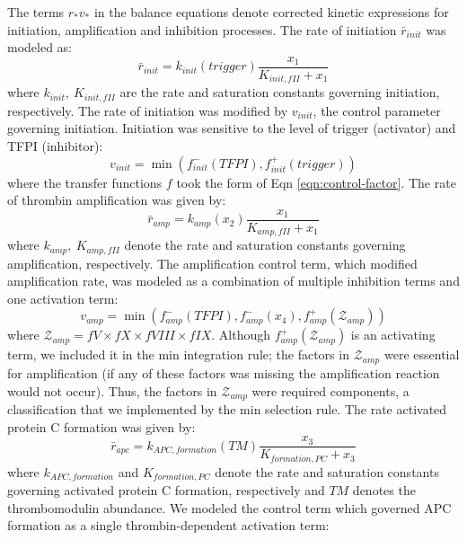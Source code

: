 \documentclass[processes,article,received,moreauthors,pdftex,12pt,a4paper]{mdpi}
\begin{document}
The terms $r_{*}v_{*}$ in the balance equations denote corrected kinetic expressions for initiation, amplification and inhibition processes. 
The rate of initiation $\bar{r}_{init}$ was modeled as:
\begin{equation}
	\bar{r}_{init} = k_{init}\left(trigger\right)\frac{x_{1}}{K_{init,fII} + x_{1}}
\end{equation}where $k_{init},~K_{init,fII}$ are the rate and saturation constants governing initiation, respectively. 
The rate of initiation was modified by $v_{init}$, the control parameter governing initiation. 
Initiation was sensitive to the level of trigger (activator) and TFPI (inhibitor):
\begin{equation}
	v_{init} = \min\left(f^{-}_{init}\left(TFPI\right),f^{+}_{init}\left(trigger\right)\right)
\end{equation}where the transfer functions $f$ took the form of Eqn \eqref{eqn:control-factor}.
The rate of thrombin amplification was given by:
\begin{equation}
	\bar{r}_{amp} = k_{amp}\left(x_{2}\right)\frac{x_{1}}{K_{amp,fII}+x_{1}}
\end{equation}where $k_{amp},~K_{amp,fII}$ denote the rate and saturation constants governing amplification, respectively. 
The amplification control term, which modified amplification rate, was modeled as a combination of multiple inhibition terms and one activation term:
\begin{equation}
	v_{amp} = \min\left(f^{-}_{amp}\left(TFPI\right),f^{-}_{amp}\left(x_{4}\right),f^{+}_{amp}\left(\mathcal{Z}_{amp}\right)\right)
\end{equation}where $\mathcal{Z}_{amp} = fV\times fX\times fVIII\times fIX$. Although $f^{+}_{amp}\left(\mathcal{Z}_{amp}\right)$ is an activating term, 
we included it in the min integration rule; the factors in $\mathcal{Z}_{amp}$ were essential for amplification (if any of these factors was missing
the amplification reaction would not occur). Thus, the factors in $\mathcal{Z}_{amp}$ were required components, a classification
that we implemented by the min selection rule.
The rate activated protein C formation was given by:
\begin{equation}
	\bar{r}_{apc} = k_{APC,formation}\left(TM\right)\frac{x_{3}}{K_{formation,PC} + x_{3}}
\end{equation}where $k_{APC,formation}$ and $K_{formation,PC}$ denote the rate and saturation constants governing activated protein C formation, respectively and $TM$ denotes
the thrombomodulin abundance. We modeled the control term which governed APC formation as a single thrombin-dependent activation term:
\end{document}
